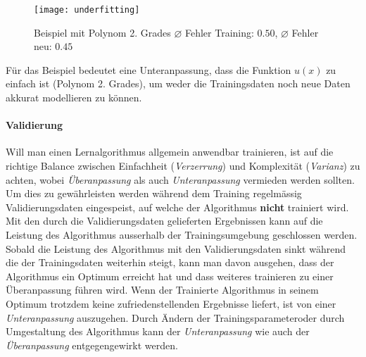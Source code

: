 \begin{figure}[h]
	\centering
	\texttt{[image: underfitting]}
	\caption[Beispiel mit Polynom 2. Grades]{Beispiel mit Polynom 2. Grades $\diameter$ Fehler Training: $0.50$, $\diameter$ Fehler neu: $0.45$}
\end{figure}

Für das Beispiel bedeutet eine Unteranpassung, dass die Funktion $u(x)$ zu einfach ist (Polynom 2. Grades), um weder die Trainingsdaten noch neue Daten akkurat modellieren zu können.

\paragraph{Validierung} Will man einen Lernalgorithmus allgemein anwendbar trainieren, ist auf die richtige Balance zwischen Einfachheit (\textit{Verzerrung}) und Komplexität (\textit{Varianz}) zu achten, wobei \textit{Überanpassung} als auch \textit{Unteranpassung} vermieden werden sollten. Um dies zu gewährleisten werden während dem Training regelmässig Validierungsdaten eingespeist, auf welche der Algorithmus \textbf{nicht} trainiert wird. Mit den durch die Validierungsdaten gelieferten Ergebnissen kann auf die Leistung des Algorithmus ausserhalb der Trainingsumgebung geschlossen werden. Sobald die Leistung des Algorithmus mit den Validierungsdaten sinkt während die der Trainingsdaten weiterhin steigt, kann man davon ausgehen, dass der Algorithmus ein Optimum erreicht hat und dass weiteres trainieren zu einer Überanpassung führen wird. Wenn der Trainierte Algorithmus in seinem Optimum trotzdem keine zufriedenstellenden Ergebnisse liefert, ist von einer \textit{Unteranpassung} auszugehen. Durch Ändern der Trainingsparameter\footnotemark oder durch Umgestaltung des Algorithmus kann der \textit{Unteranpassung} wie auch der \textit{Überanpassung} entgegengewirkt werden.


\newpage

